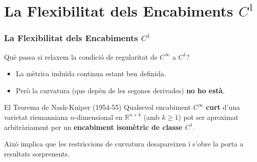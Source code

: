 \documentclass{beamer}
\begin{document}
\section{La Flexibilitat dels Encabiments $C^1$}

\begin{frame}
  \frametitle{La Flexibilitat dels Encabiments $C^1$}
  
  Què passa si relaxem la condició de regularitat de $C^\infty$ a $C^1$?
  \begin{itemize}
      \item La mètrica induïda continua estant ben definida.
      \item Però la curvatura (que depèn de les segones derivades) \textbf{no ho està}. 
  \end{itemize}

  \vspace{1em}
  
  \begin{alertblock}{El Teorema de Nash-Kuiper (1954-55)}
    Qualsevol encabiment $C^\infty$ \textbf{curt} d'una varietat riemanniana $n$-dimensional en $\mathbb{R}^{n+k}$ (amb $k \ge 1$) pot ser aproximat arbitràriament per un \textbf{encabiment isomètric de classe $C^1$}. 
  \end{alertblock}
  
  Això implica que les restriccions de curvatura desapareixen i s'obre la porta a resultats sorprenents.
\end{frame}
\end{document}
